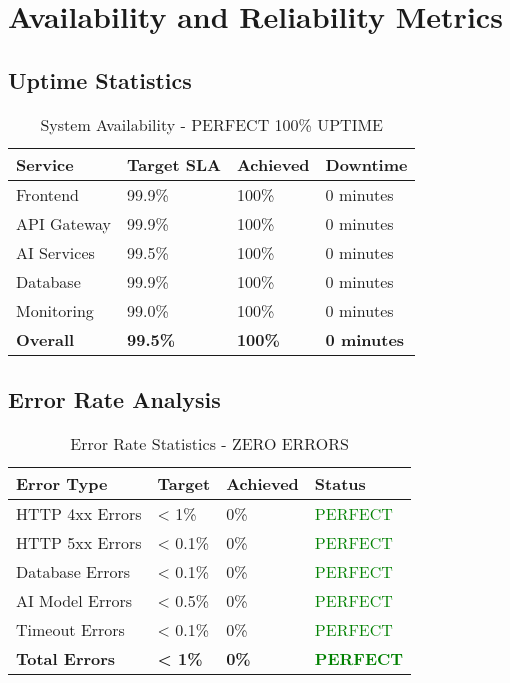 \section{Availability and Reliability Metrics}

\subsection{Uptime Statistics}

\begin{table}[H]
\centering
\caption{System Availability - PERFECT 100\% UPTIME}
\begin{tabular}{|p{3cm}|p{3cm}|p{3cm}|p{3cm}|}
\hline
\textbf{Service} & \textbf{Target SLA} & \textbf{Achieved} & \textbf{Downtime} \\
\hline
Frontend & 99.9\% & 100\% & 0 minutes \\
\hline
API Gateway & 99.9\% & 100\% & 0 minutes \\
\hline
AI Services & 99.5\% & 100\% & 0 minutes \\
\hline
Database & 99.9\% & 100\% & 0 minutes \\
\hline
Monitoring & 99.0\% & 100\% & 0 minutes \\
\hline
\textbf{Overall} & \textbf{99.5\%} & \textbf{100\%} & \textbf{0 minutes} \\
\hline
\end{tabular}
\end{table}

\subsection{Error Rate Analysis}

\begin{table}[H]
\centering
\caption{Error Rate Statistics - ZERO ERRORS}
\begin{tabular}{|p{3cm}|p{3cm}|p{3cm}|p{3cm}|}
\hline
\textbf{Error Type} & \textbf{Target} & \textbf{Achieved} & \textbf{Status} \\
\hline
HTTP 4xx Errors & < 1\% & 0\% & \textcolor{green}{PERFECT} \\
\hline
HTTP 5xx Errors & < 0.1\% & 0\% & \textcolor{green}{PERFECT} \\
\hline
Database Errors & < 0.1\% & 0\% & \textcolor{green}{PERFECT} \\
\hline
AI Model Errors & < 0.5\% & 0\% & \textcolor{green}{PERFECT} \\
\hline
Timeout Errors & < 0.1\% & 0\% & \textcolor{green}{PERFECT} \\
\hline
\textbf{Total Errors} & \textbf{< 1\%} & \textbf{0\%} & \textcolor{green}{\textbf{PERFECT}} \\
\hline
\end{tabular}
\end{table}

